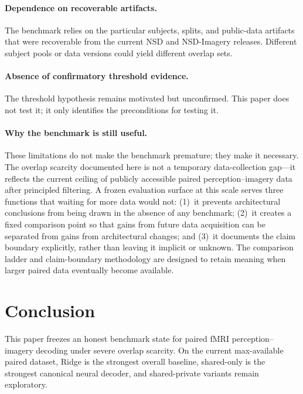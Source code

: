 \documentclass{article}
\begin{document}
\paragraph{Dependence on recoverable artifacts.}
The benchmark relies on the particular subjects, splits, and public-data
artifacts that were recoverable from the current NSD and NSD-Imagery releases.
Different subject pools or data versions could yield different overlap sets.

\paragraph{Absence of confirmatory threshold evidence.}
The threshold hypothesis remains motivated but unconfirmed.  This paper does not
test it; it only identifies the preconditions for testing it.

\paragraph{Why the benchmark is still useful.}
These limitations do not make the benchmark premature; they make it necessary.
The overlap scarcity documented here is not a temporary data-collection gap---it
reflects the current ceiling of publicly accessible paired perception--imagery
data after principled filtering.  A frozen evaluation surface at this scale
serves three functions that waiting for more data would not: (1)~it prevents
architectural conclusions from being drawn in the absence of any benchmark;
(2)~it creates a fixed comparison point so that gains from future data
acquisition can be separated from gains from architectural changes; and (3)~it
documents the claim boundary explicitly, rather than leaving it implicit or
unknown.  The comparison ladder and claim-boundary methodology are designed to
retain meaning when larger paired data eventually become available.

\section{Conclusion}

This paper freezes an honest benchmark state for paired fMRI
perception--imagery decoding under severe overlap scarcity.  On the current
max-available paired dataset, Ridge is the strongest overall baseline,
shared-only is the strongest canonical neural decoder, and shared-private
variants remain exploratory.
\end{document}

